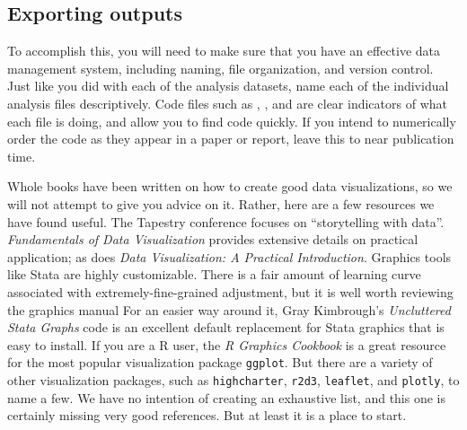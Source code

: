 \subsection{Exporting outputs}

To accomplish this, you will need to make sure that you have an effective data management system, including naming, file organization, and version control.
Just like you did with each of the analysis datasets, name each of the individual analysis files descriptively.
Code files such as , , and  
are clear indicators of what each file is doing, and allow you to find code quickly.
If you intend to numerically order the code as they appear in a paper or report, 
leave this to near publication time.



Whole books have been written on how to create good data visualizations,
so we will not attempt to give you advice on it.
Rather, here are a few resources we have found useful.
The Tapestry conference focuses on ``storytelling with data''.
\textit{Fundamentals of Data Visualization} provides extensive details on practical application;
as does \textit{Data Visualization: A Practical Introduction}.
Graphics tools like Stata are highly customizable.
There is a fair amount of learning curve associated with extremely-fine-grained adjustment,
but it is well worth reviewing the graphics manual
For an easier way around it, Gray Kimbrough's \textit{Uncluttered Stata Graphs} code is an excellent default replacement for Stata graphics that is easy to install.
If you are a R user, the \textit{R Graphics Cookbook} 
is a great resource for the most popular visualization package \texttt{ggplot}. 
But there are a variety of other visualization packages, 
such as \texttt{highcharter}, 
\texttt{r2d3}, 
\texttt{leaflet}, 
and \texttt{plotly}, to name a few.
We have no intention of creating an exhaustive list, and this one is certainly missing very good references.
But at least it is a place to start.


